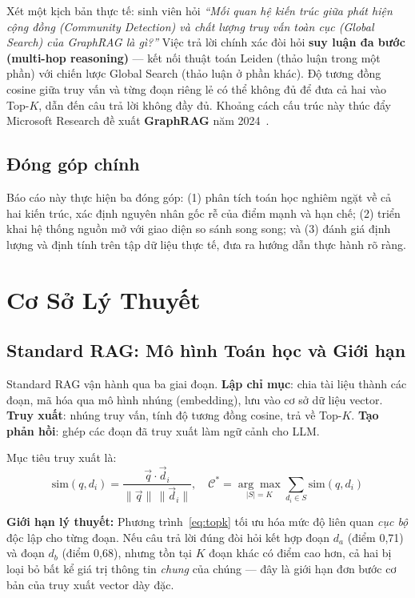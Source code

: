 \documentclass[10pt, conference, a4paper]{IEEEtran}
\begin{document}
Xét một kịch bản thực tế: sinh viên hỏi \emph{``Mối quan hệ kiến
trúc giữa phát hiện cộng đồng (Community Detection) và chất lượng
truy vấn toàn cục (Global Search) của GraphRAG là gì?''} Việc trả lời
chính xác đòi hỏi \textbf{suy luận đa bước (multi-hop reasoning)} —
kết nối thuật toán Leiden (thảo luận trong một phần) với chiến lược
Global Search (thảo luận ở phần khác). Độ tương đồng cosine giữa
truy vấn và từng đoạn riêng lẻ có thể không đủ để đưa cả hai vào
Top-$K$, dẫn đến câu trả lời không đầy đủ. Khoảng cách cấu trúc này
thúc đẩy Microsoft Research đề xuất \textbf{GraphRAG} năm 2024~\cite{edge2024graphrag}.

\subsection{Đóng góp chính}

Báo cáo này thực hiện ba đóng góp: (1) phân tích toán học nghiêm ngặt
về cả hai kiến trúc, xác định nguyên nhân gốc rễ của điểm mạnh và
hạn chế; (2) triển khai hệ thống nguồn mở với giao diện so sánh song
song; và (3) đánh giá định lượng và định tính trên tập dữ liệu thực
tế, đưa ra hướng dẫn thực hành rõ ràng.

\section{Cơ Sở Lý Thuyết}

\subsection{Standard RAG: Mô hình Toán học và Giới hạn}

Standard RAG vận hành qua ba giai đoạn. \textbf{Lập chỉ mục}: chia
tài liệu thành các đoạn, mã hóa qua mô hình nhúng (embedding), lưu
vào cơ sở dữ liệu vector. \textbf{Truy xuất}: nhúng truy vấn, tính
độ tương đồng cosine, trả về Top-$K$. \textbf{Tạo phản hồi}: ghép
các đoạn đã truy xuất làm ngữ cảnh cho LLM.

Mục tiêu truy xuất là:
\begin{equation}
  \text{sim}(q, d_i) = \frac{\vec{q}\cdot\vec{d}_i}
    {\|\vec{q}\|\,\|\vec{d}_i\|},\quad
  \mathcal{C}^{*} = \underset{|S|=K}{\arg\max}
    \sum_{d_i\in S}\text{sim}(q,d_i)
  \label{eq:topk}
\end{equation}

\textbf{Giới hạn lý thuyết:} Phương trình~\eqref{eq:topk} tối ưu
hóa mức độ liên quan \emph{cục bộ} độc lập cho từng đoạn. Nếu câu
trả lời đúng đòi hỏi kết hợp đoạn $d_a$ (điểm 0,71) và đoạn $d_b$
(điểm 0,68), nhưng tồn tại $K$ đoạn khác có điểm cao hơn, cả hai
bị loại bỏ bất kể giá trị thông tin \emph{chung} của chúng — đây là
giới hạn đơn bước cơ bản của truy xuất vector dày đặc.
\end{document}
